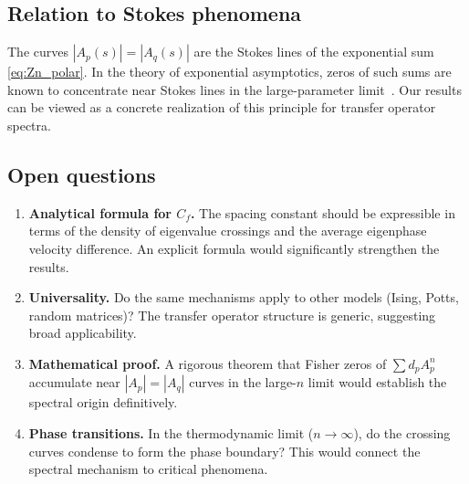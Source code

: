 \documentclass[12pt]{article}
\theoremstyle{definition}
\theoremstyle{remark}
\begin{document}
\subsection{Relation to Stokes phenomena}

The curves $|A_p(s)| = |A_q(s)|$ are the Stokes lines of the
exponential sum \eqref{eq:Zn_polar}.  In the theory of exponential
asymptotics, zeros of such sums are known to concentrate near Stokes
lines in the large-parameter limit~\cite{BerryHowls1991}.  Our
results can be viewed as a concrete realization of this principle for
transfer operator spectra.

\subsection{Open questions}

\begin{enumerate}
\item \textbf{Analytical formula for $C_f$.}  The spacing constant
  should be expressible in terms of the density of eigenvalue crossings
  and the average eigenphase velocity difference.  An explicit formula
  would significantly strengthen the results.

\item \textbf{Universality.}  Do the same mechanisms apply to
  other models (Ising, Potts, random matrices)?  The transfer
  operator structure is generic, suggesting broad applicability.

\item \textbf{Mathematical proof.}  A rigorous theorem that Fisher
  zeros of $\sum d_p A_p^n$ accumulate near $|A_p| = |A_q|$ curves
  in the large-$n$ limit would establish the spectral origin
  definitively.

\item \textbf{Phase transitions.}  In the thermodynamic limit
  ($n \to \infty$), do the crossing curves condense to form the
  phase boundary?  This would connect the spectral mechanism to
  critical phenomena.
\end{enumerate}
\end{document}
